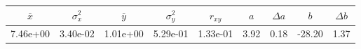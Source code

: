 \begin{tabular}{ccccccccc}
\toprule
$\overline{x}$ & $\sigma_x^2$ & $\overline{y}$ & $\sigma_y^2$ & $r_{xy}$ & $a$ & $\Delta a$ & $b$ & $\Delta b$ \\
\midrule
7.46e+00 & 3.40e-02 & 1.01e+00 & 5.29e-01 & 1.33e-01 & 3.92 & 0.18 & -28.20 & 1.37 \\
\bottomrule
\end{tabular}
